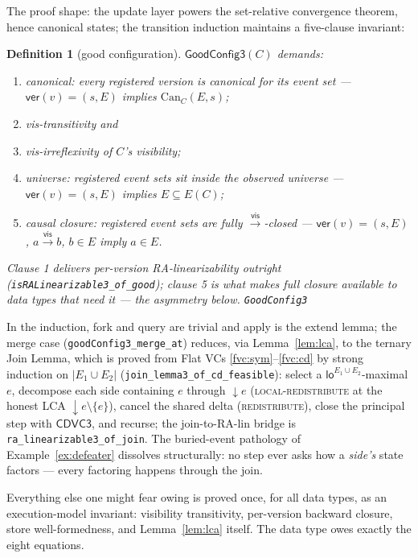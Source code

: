 \documentclass[11pt]{article}
\newtheorem{definition}[theorem]{Definition}
\newcommand{\vis}{\xrightarrow{\mathsf{vis}}}
\newcommand{\loE}[1]{\mathsf{lo}^{#1}}
\newcommand{\dow}[1]{{\downarrow}#1}
\newcommand{\cd}{\mathsf{CDVC3}}
\newcommand{\lean}[1]{\texttt{#1}}
\begin{document}
The proof shape: the update layer powers the set-relative convergence
theorem, hence canonical states; the transition induction maintains a
five-clause invariant:

\begin{definition}[good configuration]
\label{def:good}
$\mathsf{GoodConfig3}(C)$ demands:
\begin{enumerate}[leftmargin=2.2em]
\item \emph{canonical}: every registered version is canonical for its
  event set --- $\mathsf{ver}(v) = (s, E)$ implies
  $\mathrm{Can}_C(E, s)$;
\item \emph{vis-transitivity} and
\item \emph{vis-irreflexivity} of $C$'s visibility;
\item \emph{universe}: registered event sets sit inside the observed
  universe --- $\mathsf{ver}(v) = (s, E)$ implies $E \subseteq E(C)$;
\item \emph{causal closure}: registered event sets are \emph{fully}
  $\vis$-closed --- $\mathsf{ver}(v) = (s, E)$, $a \vis b$, $b \in E$
  imply $a \in E$.
\end{enumerate}
Clause 1 delivers per-version RA-linearizability outright
(\lean{isRALinearizable3\_of\_good}); clause 5 is what makes \emph{full}
closure available to data types that need it --- the asymmetry below.
\hfill\lean{GoodConfig3}
\end{definition}

In the induction, fork and query are trivial and apply is the extend
lemma; the merge case (\lean{goodConfig3\_merge\_at}) reduces, via
Lemma~\ref{lem:lca}, to the ternary Join Lemma, which is proved from
Flat VCs \ref{fvc:sym}--\ref{fvc:cd} by strong induction on
$|E_1 \cup E_2|$ (\lean{join\_lemma3\_of\_cd\_feasible}): select a
$\loE{E_1\cup E_2}$-maximal $e$, decompose each side containing $e$
through $\dow{e}$ (\textsc{local-redistribute} at the honest LCA
$\dow{e}\setminus\{e\}$), cancel the shared delta
(\textsc{redistribute}), close the principal step with $\cd$, and
recurse; the join-to-RA-lin bridge is
\lean{ra\_linearizable3\_of\_join}. The buried-event pathology of
Example~\ref{ex:defeater} dissolves structurally: no step ever asks how
a \emph{side's} state factors --- every factoring happens through the
join.

Everything else one might fear owing is proved once, for all data types,
as an execution-model invariant: visibility transitivity, per-version
backward closure, store well-formedness, and Lemma~\ref{lem:lca} itself.
The data type owes exactly the eight equations.
\end{document}
